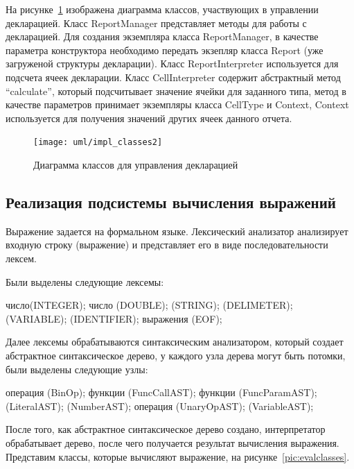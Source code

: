 \documentclass[14pt,a4paper]{reportmod}
\begin{document}
На рисунке~\ref{pic:reportmanager} изображена диаграмма классов, участвующих в управлении декларацией. Класс ReportManager представляет методы для работы с декларацией. Для создания экземпляра класса ReportManager, в качестве параметра конструктора необходимо передать экзепляр класса Report (уже загруженой структуры декларации). Класс ReportInterpreter используется для подсчета ячеек декларации. Класс CellInterpreter содержит абстрактный метод ``calculate'', который подсчитывает значение ячейки для заданного типа, метод в качестве параметров принимает экземпляры класса CellType и Context, Context используется для получения значений других ячеек данного отчета.

\begin{figure}
  \centering
  \texttt{[image: uml/impl\_classes2]}
  \caption{Диаграмма классов для управления декларацией}
  \label{pic:reportmanager}
\end{figure}

\subsection{Реализация подсистемы вычисления выражений}

Выражение задается на формальном языке. Лексический анализатор анализирует входную строку (выражение) и представляет его в виде последовательности лексем.

Были выделены следующие лексемы:

\begin{itemize}
   число(INTEGER);
   число (DOUBLE);
   (STRING);
   (DELIMETER);
   (VARIABLE);
   (IDENTIFIER);
   выражения (EOF);
\end{itemize}

Далее лексемы обрабатываются синтаксическим анализатором, который создает абстрактное синтаксическое дерево, у каждого узла дерева могут быть потомки, были выделены следующие узлы:
\begin{itemize}
   операция (BinOp);
   функции (FuncCallAST);
   функции (FuncParamAST);
   (LiteralAST);
   (NumberAST);
   операция (UnaryOpAST);
   (VariableAST);
\end{itemize}

После того, как абстрактное синтаксическое дерево создано, интерпретатор обрабатывает дерево, после чего получается результат вычисления выражения. Представим классы, которые вычисляют выражение, на рисунке~\ref{pic:evalclasses}.
\end{document}

